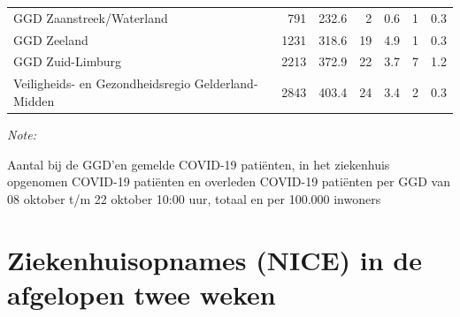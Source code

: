 \documentclass[
  english,
  man,floatsintext]{apa6}
\begin{document}
\begin{table}
\begin{threeparttable}
\begin{tabular}{lrrrrrr}
GGD Zaanstreek/Waterland & 791 & 232.6 & 2 & 0.6 & 1 & 0.3\\
GGD Zeeland & 1231 & 318.6 & 19 & 4.9 & 1 & 0.3\\
GGD Zuid-Limburg & 2213 & 372.9 & 22 & 3.7 & 7 & 1.2\\
Veiligheids- en Gezondheidsregio Gelderland-Midden & 2843 & 403.4 & 24 & 3.4 & 2 & 0.3\\
\bottomrule
\end{tabular}
\begin{tablenotes}
\item \textit{Note: } 
\item Aantal bij de GGD’en gemelde COVID-19 patiënten, in het ziekenhuis opgenomen COVID-19 patiënten en overleden COVID-19 patiënten per GGD van 08 oktober t/m 22 oktober 10:00 uur, totaal en per 100.000 inwoners
\end{tablenotes}
\end{threeparttable}
\endgroup{}
\end{table}

\newpage

\hypertarget{ziekenhuisopnames-nice-in-de-afgelopen-twee-weken}{%
\section{Ziekenhuisopnames (NICE) in de afgelopen twee weken}\label{ziekenhuisopnames-nice-in-de-afgelopen-twee-weken}}
\end{document}
